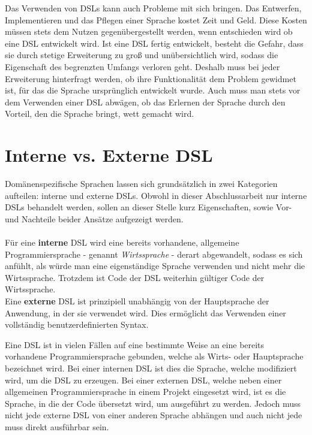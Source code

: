 Das Verwenden von DSLs kann auch Probleme mit sich bringen. Das Entwerfen, Implementieren und das Pflegen einer Sprache kostet Zeit und Geld. Diese Kosten müssen stets dem Nutzen gegenübergestellt werden, wenn entschieden wird ob eine DSL entwickelt wird. Ist eine DSL fertig entwickelt, besteht die Gefahr, dass sie durch stetige Erweiterung zu groß und unübersichtlich wird, sodass die Eigenschaft des begrenzten Umfangs verloren geht. Deshalb muss bei jeder Erweiterung hinterfragt werden, ob ihre Funktionalität dem Problem gewidmet ist, für das die Sprache ursprünglich entwickelt wurde. Auch muss man stets vor dem Verwenden einer DSL abwägen, ob das Erlernen der Sprache durch den Vorteil, den die Sprache bringt, wett gemacht wird\cite{www:fowlerWorkbench}.

\section{Interne vs. Externe DSL}\label{sct:2.2:intvsext}
Domänenspezifische Sprachen lassen sich grundsätzlich in zwei Kategorien aufteilen: interne und externe DSLs. Obwohl in dieser Abschlussarbeit nur interne DSLs behandelt werden, sollen an dieser Stelle kurz Eigenschaften, sowie Vor- und Nachteile beider Ansätze aufgezeigt werden.
\\ \\ %
Für eine \textbf{interne} DSL wird eine bereits vorhandene, allgemeine Programmiersprache - genannt \emph{Wirtssprache} - derart abgewandelt, sodass es sich anfühlt, als würde man eine eigenständige Sprache verwenden und nicht mehr die Wirtssprache. Trotzdem ist Code der DSL weiterhin gültiger Code der Wirtssprache.\\
Eine \textbf{externe} DSL ist prinzipiell unabhängig von der Hauptsprache der Anwendung, in der sie verwendet wird. Dies ermöglicht das Verwenden einer vollständig benutzerdefinierten Syntax.

Eine DSL ist in vielen Fällen auf eine bestimmte Weise an eine bereits vorhandene Programmiersprache gebunden, welche als Wirts- oder Hauptsprache bezeichnet wird. Bei einer internen DSL ist dies die Sprache, welche modifiziert wird, um die DSL zu erzeugen. Bei einer externen DSL, welche neben einer allgemeinen Programmiersprache in einem Projekt eingesetzt wird, ist es die Sprache, in die der Code übersetzt wird, um ausgeführt zu werden.
Jedoch muss nicht jede externe DSL von einer anderen Sprache abhängen und auch nicht jede muss direkt ausführbar sein\cite{paper:Mernik}.
\\ \\ %

